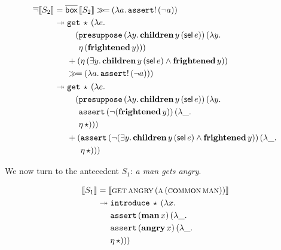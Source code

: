 \begin{align*}
  \mathop{\overline{\lnot}} \llbracket S_2 \rrbracket
  &= \overline{\textsf{box}}\,\llbracket S_2 \rrbracket \mathbin{\gg\!=} (\lambda a.\, \mathtt{assert}!\,(\lnot a)) \\
  &\twoheadrightarrow 
    \begin{aligned}[t]
      &\mathtt{get}\,\star\,(\lambda e.\,  \\
      &\quad \begin{aligned}[t]
          (&\mathtt{presuppose}\,(\lambda y.\, \textbf{children}\,y\,(\textsf{sel}\,e))\,(\lambda y.\,  \\
           &\eta\,(\textbf{frightened}\,y)))
         \end{aligned} \\
      &+ (\eta\,(\exists y.\, \textbf{children}\,y\,(\textsf{sel}\,e) \land \textbf{frightened}\,y)) \\
      &\mathbin{\gg\!=} (\lambda a.\, \mathtt{assert}!\,(\lnot a)))
       \end{aligned} \\
  &\twoheadrightarrow 
    \begin{aligned}[t]
      &\mathtt{get}\,\star\,(\lambda e.\,  \\
      &\quad \begin{aligned}[t]
          (&\mathtt{presuppose}\,(\lambda y.\, \textbf{children}\,y\,(\textsf{sel}\,e))\,(\lambda y.\,  \\
           &\mathtt{assert}\,(\lnot (\textbf{frightened}\,y))\,(\lambda \_.\,  \\
           &\eta\,\star)))
         \end{aligned} \\
      &+ \begin{aligned}[t]
          (&\mathtt{assert}\,(\lnot (\exists y.\, \textbf{children}\,y\,(\textsf{sel}\,e) \land \textbf{frightened}\,y))\,(\lambda \_.\,  \\
           &\eta\,\star)))
         \end{aligned}
    \end{aligned}
\end{align*}

We now turn to the antecedent $S_1$: \emph{a man gets angry}.

\begin{align*}
  \llbracket S_1 \rrbracket
  &= \llbracket \textsc{get}\,\textsc{angry}\,(\textsc{a}\,(\textsc{common}\,\textsc{man})) \rrbracket \\
  &\twoheadrightarrow \begin{aligned}[t]
      &\mathtt{introduce}\,\star\,(\lambda x.\,  \\
      &\mathtt{assert}\,(\textbf{man}\,x)\,(\lambda \_.\,  \\
      &\mathtt{assert}\,(\textbf{angry}\,x)\,(\lambda \_.\,  \\
      &\eta\,\star)))
    \end{aligned}
\end{align*}

